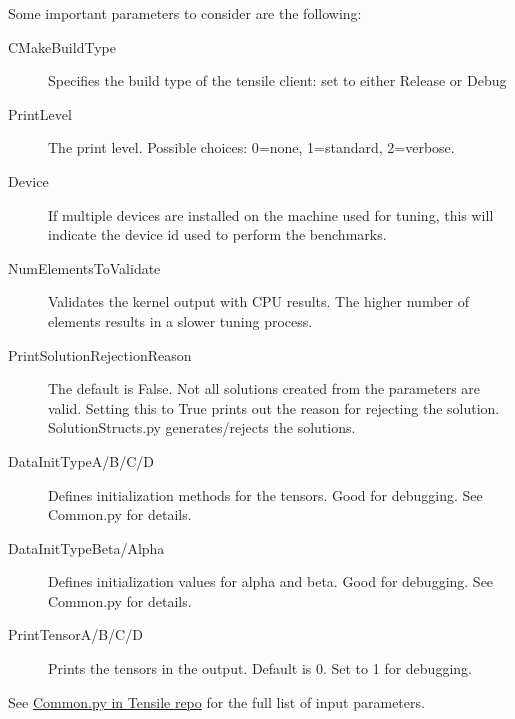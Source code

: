 \documentclass[]{article}
\begin{document}
\noindent
Some important parameters to consider are the following:
\begin{description}
\item[CMakeBuildType] Specifies the build type of the tensile client: set to either Release or Debug
\item[PrintLevel] The print level. Possible choices: 0=none, 1=standard, 2=verbose.
\item[Device] If multiple devices are installed on the machine used for tuning, this will indicate the device id used to perform the benchmarks.
\item[NumElementsToValidate] Validates the kernel output with CPU results. The higher number of elements results in a slower tuning process.
\item[PrintSolutionRejectionReason] The default is False. Not all solutions created from the parameters are valid. Setting this to True prints out the reason for rejecting the solution. SolutionStructs.py generates/rejects the solutions.
\item[DataInitTypeA/B/C/D] Defines initialization methods for the tensors. Good for debugging. See Common.py for details.
\item[DataInitTypeBeta/Alpha] Defines initialization values for alpha and beta. Good for debugging. See Common.py for details.
\item[PrintTensorA/B/C/D] Prints the tensors in the output. Default is 0. Set to 1 for debugging.
\end{description}

\noindent
See \href{https://github.com/ROCmSoftwarePlatform/Tensile/blob/master/Tensile/Common.py}{Common.py in Tensile repo} for the full list of input parameters.
\end{document}
